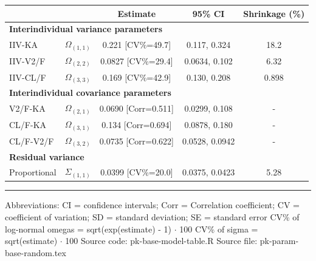 \setlength{\tabcolsep}{5pt} 
\begin{threeparttable}
\renewcommand{\arraystretch}{1.3}
\begin{tabular}[h]{lcccc}
\hline
 &  & Estimate & 95\% CI & Shrinkage (\%) \\
\hline
\multicolumn{5}{l}{\textbf{Interindividual variance parameters}}\\%
IIV-KA & $\Omega_{(1,1)}$ & 0.221 [CV\%=49.7] & 0.117, 0.324 & 18.2 \\
IIV-V2/F & $\Omega_{(2,2)}$ & 0.0827 [CV\%=29.4] & 0.0634, 0.102 & 6.32 \\
IIV-CL/F & $\Omega_{(3,3)}$ & 0.169 [CV\%=42.9] & 0.130, 0.208 & 0.898 \\
\hline \multicolumn{5}{l}{\textbf{Interindividual covariance parameters}}\\%
V2/F-KA & $\Omega_{(2,1)}$ & 0.0690 [Corr=0.511] & 0.0299, 0.108 & - \\
CL/F-KA & $\Omega_{(3,1)}$ & 0.134 [Corr=0.694] & 0.0878, 0.180 & - \\
CL/F-V2/F & $\Omega_{(3,2)}$ & 0.0735 [Corr=0.622] & 0.0528, 0.0942 & - \\
\hline \multicolumn{5}{l}{\textbf{Residual variance}}\\%
Proportional & $\Sigma_{(1,1)}$ & 0.0399 [CV\%=20.0] & 0.0375, 0.0423 & 5.28 \\
\hline
\end{tabular}
\end{threeparttable}
 
\vspace{0.67cm}
 
\begin{minipage}{1\linewidth}
\linespread{1.1}\selectfont
\rule{1\linewidth}{0.4pt}
\vspace{0.02cm}
Abbreviations: CI = confidence intervals; 
                        Corr = Correlation coefficient;
                        CV = coefficient of variation;
                        SD = standard deviation;
                        SE = standard error \newline
CV\% of log-normal omegas = sqrt(exp(estimate) - 1) $\cdot$ 100 \newline
CV\% of sigma = sqrt(estimate) $\cdot$ 100 \newline
Source code: pk-base-model-table.R \newline
Source file: pk-param-base-random.tex \newline
\end{minipage}
